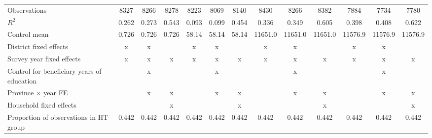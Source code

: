{\begin{tabular}{l*{12}{c}}
\midrule
Observations        &        8327         &        8266         &        8278         &        8223         &        8069         &        8140         &        8430         &        8266         &        8382         &        7884         &        7734         &        7780         \\
\(R^{2}\)           &       0.262         &       0.273         &       0.543         &       0.093         &       0.099         &       0.454         &       0.336         &       0.349         &       0.605         &       0.398         &       0.408         &       0.622         \\
Control mean        &       0.726         &       0.726         &       0.726         &       58.14         &       58.14         &       58.14         &     11651.0         &     11651.0         &     11651.0         &     11576.9         &     11576.9         &     11576.9         \\
District fixed effects&           x         &           x         &                     &           x         &           x         &                     &           x         &           x         &                     &           x         &           x         &                     \\
Survey year fixed effects&           x         &           x         &           x         &           x         &           x         &           x         &           x         &           x         &           x         &           x         &           x         &           x         \\
Control for beneficiary years of education&                     &           x         &                     &                     &           x         &                     &                     &           x         &                     &                     &           x         &                     \\
Province $\times$  year FE&                     &           x         &           x         &                     &           x         &           x         &                     &           x         &           x         &                     &           x         &           x         \\
Household fixed effects&                     &                     &           x         &                     &                     &           x         &                     &                     &           x         &                     &                     &           x         \\
Proportion of observations in HT group&       0.442         &       0.442         &       0.442         &       0.442         &       0.442         &       0.442         &       0.442         &       0.442         &       0.442         &       0.442         &       0.442         &       0.442         \\
\bottomrule
\end{tabular}
}
